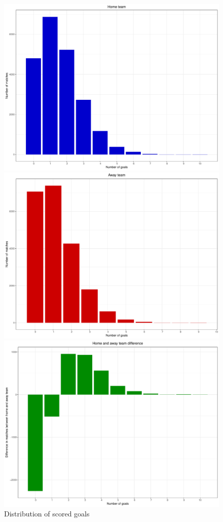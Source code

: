 \begin{figure}[H]
\begin{minipage}[b]{0.49\textwidth}
\includegraphics[width=\textwidth]{figs/goal_distribution_home}
\end{minipage}
\hfill
\begin{minipage}[b]{0.49\textwidth}
\includegraphics[width=\textwidth]{figs/goal_distribution_away}
\end{minipage}

\vspace{0.5cm}

\includegraphics[width=.49\textwidth]{figs/goal_distribution}
\caption{Distribution of scored goals}
\end{figure}

